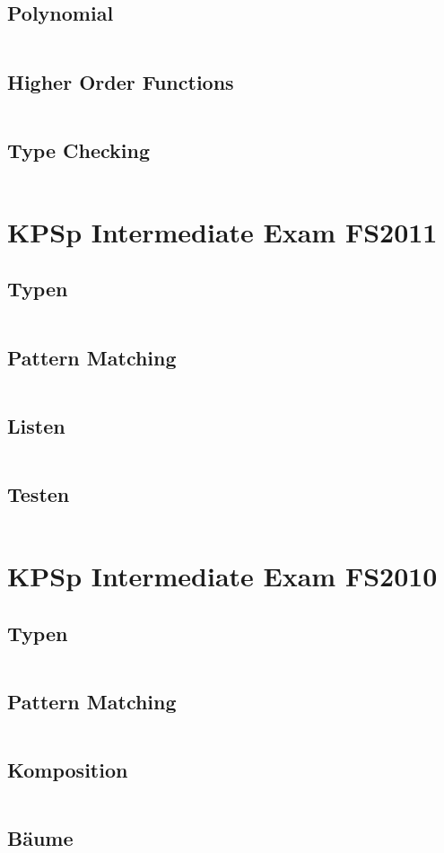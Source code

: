 \documentclass[a4paper,9pt,twoside]{book}
\newcommand{\hsfile}[1]{\inputminted[breaklines]{haskell}{../haskell/#1.hs}}
\begin{document}
\section{Polynomial}
\hsfile{exam2010/problem_2}
\section{Higher Order Functions}
\hsfile{exam2010/problem_3}
\section{Type Checking}
\hsfile{exam2010/problem_4}

\chapter{KPSp Intermediate Exam FS2011}
\section{Typen}
\hsfile{exam2011/problem_1}
\section{Pattern Matching}
\hsfile{exam2011/problem_2}
\section{Listen}
\hsfile{exam2011/problem_3}
\section{Testen}
\hsfile{exam2011/problem_4}

\chapter{KPSp Intermediate Exam FS2010}
\section{Typen}
\hsfile{exami2010/problem_1}
\section{Pattern Matching}
\hsfile{exami2010/problem_2}
\section{Komposition}
\hsfile{exami2010/problem_3}
\section{Bäume}
\hsfile{exami2010/problem_4}
\end{document}

